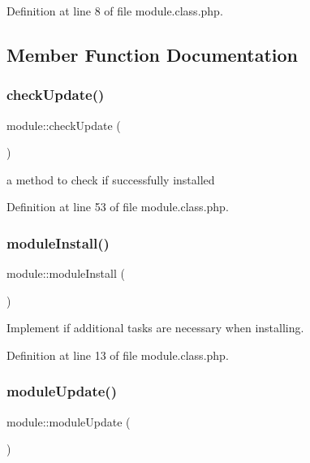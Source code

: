 Definition at line 8 of file module.\+class.\+php.



\subsection{Member Function Documentation}
\mbox{\label{classmodule_a357cb59a36a3aa94003882c8256c038e}} 
\subsubsection{\texorpdfstring{check\+Update()}{checkUpdate()}}
{\footnotesize\ttfamily module\+::check\+Update (\begin{DoxyParamCaption}{ }\end{DoxyParamCaption})}



a method to check if successfully installed 



Definition at line 53 of file module.\+class.\+php.

\mbox{\label{classmodule_a7b8280dacfb107bdea9440e4a4cf42f0}} 
\subsubsection{\texorpdfstring{module\+Install()}{moduleInstall()}}
{\footnotesize\ttfamily module\+::module\+Install (\begin{DoxyParamCaption}{ }\end{DoxyParamCaption})}



Implement if additional tasks are necessary when installing. 



Definition at line 13 of file module.\+class.\+php.

\mbox{\label{classmodule_aa71624e39c27ab5c362b8b1623b36ec4}} 
\subsubsection{\texorpdfstring{module\+Update()}{moduleUpdate()}}
{\footnotesize\ttfamily module\+::module\+Update (\begin{DoxyParamCaption}{ }\end{DoxyParamCaption})}



